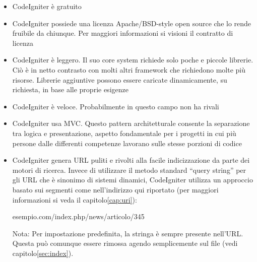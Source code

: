 \begin{itemize}
\item CodeIgniter è gratuito
\item CodeIgniter possiede una licenza Apache/BSD-style open source che lo rende fruibile da chiunque. Per maggiori informazioni si visioni il contratto di licenza
\item CodeIgniter è leggero. Il suo core system richiede solo poche e piccole librerie. Ciò è in netto contrasto con molti altri framework che richiedono molte più risorse. Librerie aggiuntive possono essere caricate dinamicamente, su richiesta, in base alle proprie esigenze
\item CodeIgniter è veloce. Probabilmente in questo campo non ha rivali
\item CodeIgniter usa \ac{MVC}. Questo pattern architetturale consente la separazione tra logica e presentazione, aspetto fondamentale per i progetti in cui più persone dalle differenti competenze lavorano sulle stesse porzioni di codice
\item CodeIgniter genera \ac{URL} puliti e rivolti alla facile indicizzazione da parte dei motori di ricerca. Invece di utilizzare il metodo standard ``query string'' per gli \ac{URL} che è sinonimo di sistemi dinamici, CodeIgniter utilizza un approccio basato sui segmenti come nell'indirizzo qui riportato (per maggiori informazioni si veda il capitolo\vref{cap:uri}):

\begin{code}
esempio.com/index.php/news/articolo/345
\end{code}

Nota: Per impostazione predefinita, la stringa  è sempre presente nell'\ac{URL}. Questa può comunque essere rimossa agendo semplicemente sul file  (vedi capitolo\vref{sec:index}).


\end{itemize}
